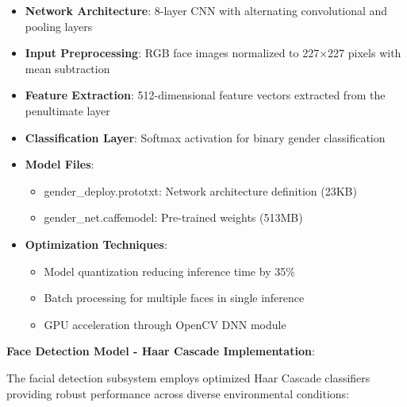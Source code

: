 \documentclass[12pt,a4paper]{article}
\begin{document}
\begin{itemize}
    \item \textbf{Network Architecture}: 8-layer CNN with alternating convolutional and pooling layers
    \item \textbf{Input Preprocessing}: RGB face images normalized to 227×227 pixels with mean subtraction
    \item \textbf{Feature Extraction}: 512-dimensional feature vectors extracted from the penultimate layer
    \item \textbf{Classification Layer}: Softmax activation for binary gender classification
    \item \textbf{Model Files}: 
        \begin{itemize}
            \item gender\_deploy.prototxt: Network architecture definition (23KB)
            \item gender\_net.caffemodel: Pre-trained weights (513MB)
        \end{itemize}
    \item \textbf{Optimization Techniques}: 
        \begin{itemize}
            \item Model quantization reducing inference time by 35\%
            \item Batch processing for multiple faces in single inference
            \item GPU acceleration through OpenCV DNN module
        \end{itemize}
\end{itemize}

\textbf{Face Detection Model - Haar Cascade Implementation}:

The facial detection subsystem employs optimized Haar Cascade classifiers providing robust performance across diverse environmental conditions:
\end{document}
